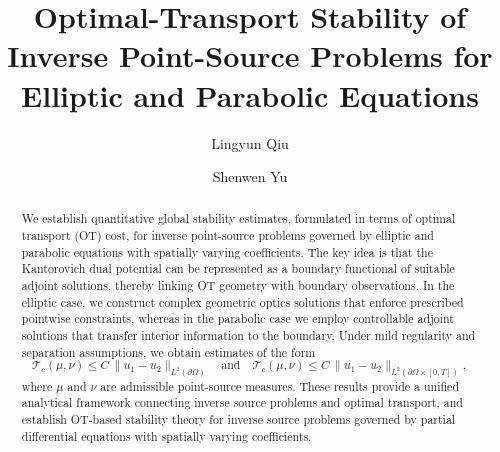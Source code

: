 \documentclass[12pt]{amsart}
\begin{document}
\title[OT Stability for Inverse Point Sources]{Optimal-Transport Stability of Inverse Point-Source Problems for Elliptic and Parabolic Equations}


\author{Lingyun Qiu}
\address{Yau Mathematical Sciences Center, Tsinghua University, Beijing,  China.
Yanqi Lake Beijing Institute of Mathematical Sciences and Applications, Beijing,  China.}
\author{Shenwen Yu}
\address{Department of Mathematical Sciences, Tsinghua University, Beijing,  China}

\begin{abstract}
We establish quantitative global stability estimates, formulated in terms of optimal transport (OT) cost,
for inverse point-source problems governed by elliptic and parabolic equations with spatially varying coefficients.
The key idea is that the Kantorovich dual potential can be represented as a boundary functional of suitable adjoint solutions,
thereby linking OT geometry with boundary observations.
In the elliptic case, we construct complex geometric optics solutions that enforce prescribed pointwise constraints,
whereas in the parabolic case we employ controllable adjoint solutions that transfer interior information to the boundary.
Under mild regularity and separation assumptions, we obtain estimates of the form
\[
\mathcal{T}_c(\mu,\nu) \le C\,\|u_1 - u_2\|_{L^2(\partial\Omega)}
\quad \text{and} \quad
\mathcal{T}_c(\mu,\nu) \le C\,\|u_1 - u_2\|_{L^2(\partial\Omega\times[0,T])},
\]
where $\mu$ and $\nu$ are admissible point-source measures.
These results provide a unified analytical framework connecting inverse source problems and optimal transport,
and establish OT-based stability theory for inverse source problems governed by partial differential equations
with spatially varying coefficients.
\end{abstract}

\maketitle

\end{document}
